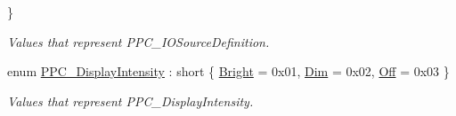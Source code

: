\begin{DoxyCompactItemize}
 \}\begin{DoxyCompactList}\small\item\em Values that represent P\+P\+C\+\_\+\+I\+O\+Source\+Definition. \end{DoxyCompactList}
\item 
enum \hyperlink{group___benchtop_precision_piezo_ga7230f1b629fed094899a6e47a99b1109}{P\+P\+C\+\_\+\+Display\+Intensity} \+: short \{ \hyperlink{group___benchtop_precision_piezo_gga7230f1b629fed094899a6e47a99b1109a4a61854b56b254dc7ddb7fb0eec280b5}{Bright} = 0x01, 
\hyperlink{group___benchtop_precision_piezo_gga7230f1b629fed094899a6e47a99b1109af16897a262b0a595bd06b526a859171b}{Dim} = 0x02, 
\hyperlink{group___benchtop_precision_piezo_gga7230f1b629fed094899a6e47a99b1109ad8a892b94d3a94ea861543c085ae782b}{Off} = 0x03
 \}\begin{DoxyCompactList}\small\item\em Values that represent P\+P\+C\+\_\+\+Display\+Intensity. \end{DoxyCompactList}
\end{DoxyCompactItemize}
